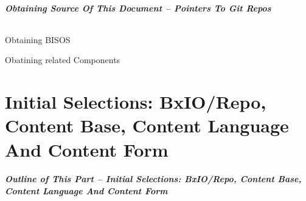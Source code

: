\begin{frame}[fragile,label=ObtainingSourceOfThisDocument--PointersToGitRepos]
    \frametitle{Obtaining Source Of This Document -- Pointers To Git Repos}
    \framesubtitle{}

    Obtaining BISOS

    Obatining related Components
    
\end{frame}


\begin{comment}
*      ================
*  [[elisp:(org-cycle)][| ]] [[elisp:(org-show-subtree)][|=]] [[elisp:(show-children 10)][|V]] [[elisp:(bx:orgm:indirectBufOther)][|>]] [[elisp:(bx:orgm:indirectBufMain)][|I]] [[elisp:(blee:ppmm:org-mode-toggle)][|N]] [[elisp:(org-top-overview)][|O]] [[elisp:(progn (org-shifttab) (org-content))][|C]] [[elisp:(delete-other-windows)][|1]]  *Part 0*   /Initial Selections: BxIO/Repo, Content Base, Content Language And Content Form/ ::  [[elisp:(org-cycle)][| ]]
\end{comment}

\newpage
\part{Initial Selections: BxIO/Repo, Content Base, Content Language And Content Form}

\begin{latexonly}
\begin{presentationMode}
\begin{frame}[fragile,plain,label=Part0]
\frametitle{Outline of This Part -- Initial Selections: BxIO/Repo, Content Base, Content Language And Content Form}
\tableofcontents[sectionstyle=show,subsectionstyle=show]
\end{frame}
\end{presentationMode}
\end{latexonly}

\begin{comment}
*  [[elisp:(org-cycle)][| ]] [[elisp:(org-show-subtree)][|=]] [[elisp:(show-children 10)][|V]] [[elisp:(bx:orgm:indirectBufOther)][|>]] [[elisp:(bx:orgm:indirectBufMain)][|I]] [[elisp:(blee:ppmm:org-mode-toggle)][|N]] [[elisp:(org-top-overview)][|O]] [[elisp:(progn (org-shifttab) (org-content))][|C]] [[elisp:(delete-other-windows)][|1]]  /Section/   BxIO/Repo Selection ::  [[elisp:(org-cycle)][| ]]
\end{comment}


